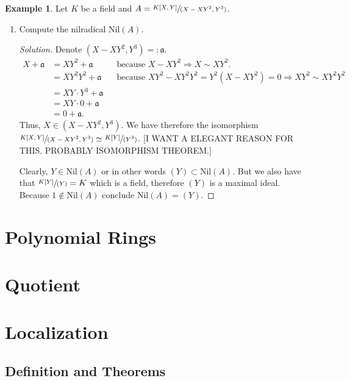 \documentclass[a4paper]{book}
\theoremstyle{definition}
\newtheorem{example}{Example}[definition]
\begin{document}
\begin{example}
    Let \(K\) be a field and \(A = \sfrac{K[X, Y]}{(X - XY^2, Y^3)}\).
    \begin{enumerate}
        \item Compute the nilradical \(\mathrm{Nil}(A)\).
        \begin{proof}[Solution]
            Denote \((X - XY^2, Y^3) =: \mathfrak{a}\).
            \begin{align*}
                X + \mathfrak{a} &= XY^2 + \mathfrak{a} && \text{because } X - XY^2 \Rightarrow X \sim XY^2 \text{.} \\
                &= XY^2 Y^2 + \mathfrak{a} && \text{because } XY^2 - XY^2Y^2 = Y^2 (X - XY^2) = 0 \Rightarrow XY^2 \sim XY^2Y^2 \\
                &= XY \cdot Y^3 + \mathfrak{a} \\
                &= XY \cdot 0 + \mathfrak{a} \\
                &= 0 + \mathfrak{a} \text{.}
            \end{align*}
            Thus, \(X \in (X - XY^2, Y^3)\). We have therefore the isomorphism \(\sfrac{K[X, Y]}{(X-XY^2, Y^3)} \simeq \sfrac{K[Y]}{(Y^3)}\). [I WANT A ELEGANT REASON FOR THIS. PROBABLY ISOMORPHISM THEOREM.]

            Clearly, \(Y \in \mathrm{Nil}(A)\) or in other words \((Y) \subset \mathrm{Nil}(A)\). But we also have that \(\sfrac{K[Y]}{(Y)} = K\) which is a field, therefore \((Y)\) is a maximal ideal. Because \(1 \not\in \mathrm{Nil}(A)\) conclude \(\mathrm{Nil}(A) = (Y)\).
        \end{proof}
    \end{enumerate}
\end{example}

\chapter{Polynomial Rings}

\chapter{Quotient}

\chapter{Localization}

\section{Definition and Theorems}
\end{document}
